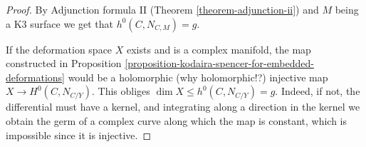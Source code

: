 \begin{proof}
By Adjunction formula II 
(Theorem \ref{theorem-adjunction-ii}) 
and $M$ being a K3 surface
we get that $h^0(C,N_{C,M})=g$.

If the deformation space $X$ exists and is a complex manifold,
the map constructed in 
Proposition \ref{proposition-kodaira-spencer-for-embedded-deformations}
would be a holomorphic (why holomorphic!?) 
injective map $X \to H^0(C,N_{C/Y})$.
This obliges $\dim X \leq  h^0(C,N_{C/Y})=g$.
Indeed, if not, the differential must have a kernel,
and integrating along a direction in the kernel
we obtain the germ of a complex curve along which
the map is constant, which is impossible since it is injective.
\end{proof}










